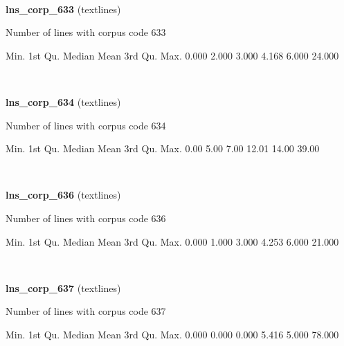 \documentclass[]{article}
\newenvironment{Shaded}{\begin{snugshade}}{\end{snugshade}}
\newcommand{\FloatTok}[1]{\textcolor[rgb]{0.00,0.00,0.81}{{#1}}}
\newcommand{\NormalTok}[1]{{#1}}
\begin{document}
~

\vspace{1em}

\textbf{lns\_corp\_633} (textlines)

Number of lines with corpus code 633

\begin{Shaded}
\begin{Highlighting}[]
   \NormalTok{Min. 1st Qu.  Median    Mean 3rd Qu.    Max. }
  \FloatTok{0.000}   \FloatTok{2.000}   \FloatTok{3.000}   \FloatTok{4.168}   \FloatTok{6.000}  \FloatTok{24.000} 
\end{Highlighting}
\end{Shaded}

~

\vspace{1em}

\textbf{lns\_corp\_634} (textlines)

Number of lines with corpus code 634

\begin{Shaded}
\begin{Highlighting}[]
   \NormalTok{Min. 1st Qu.  Median    Mean 3rd Qu.    Max. }
   \FloatTok{0.00}    \FloatTok{5.00}    \FloatTok{7.00}   \FloatTok{12.01}   \FloatTok{14.00}   \FloatTok{39.00} 
\end{Highlighting}
\end{Shaded}

~

\vspace{1em}

\textbf{lns\_corp\_636} (textlines)

Number of lines with corpus code 636

\begin{Shaded}
\begin{Highlighting}[]
   \NormalTok{Min. 1st Qu.  Median    Mean 3rd Qu.    Max. }
  \FloatTok{0.000}   \FloatTok{1.000}   \FloatTok{3.000}   \FloatTok{4.253}   \FloatTok{6.000}  \FloatTok{21.000} 
\end{Highlighting}
\end{Shaded}

~

\vspace{1em}

\textbf{lns\_corp\_637} (textlines)

Number of lines with corpus code 637

\begin{Shaded}
\begin{Highlighting}[]
   \NormalTok{Min. 1st Qu.  Median    Mean 3rd Qu.    Max. }
  \FloatTok{0.000}   \FloatTok{0.000}   \FloatTok{0.000}   \FloatTok{5.416}   \FloatTok{5.000}  \FloatTok{78.000} 
\end{Highlighting}
\end{Shaded}
\end{document}
